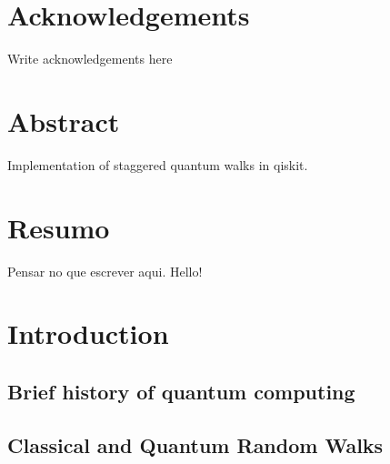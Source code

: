 \documentclass[
oneside,
11pt, a4paper,
footinclude=true,
headinclude=true,
cleardoublepage=empty
]{scrbook}
\author{Jaime Santos}
\date{\myear} %
\begin{document}
\umfrontcover	
\umtitlepage

\chapter*{Acknowledgements}
Write acknowledgements here


\chapter*{Abstract}
Implementation of staggered quantum walks in qiskit.

\cleardoublepage
\chapter*{Resumo}
Pensar no que escrever aqui.
Hello!	

\tableofcontents
\listoffigures
\listoftables



\chapter{Introduction}

\section{Brief history of quantum computing}
\cosupervisor{}
\section{Classical and Quantum Random Walks}
\end{document}
